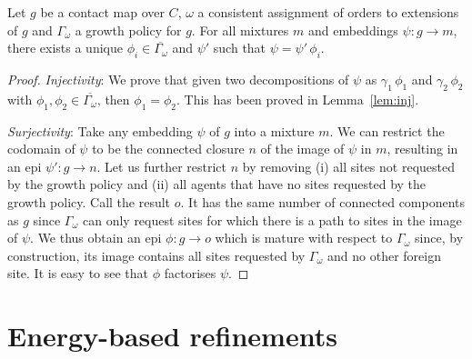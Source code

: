 \documentclass[a4paper,12pt]{article}
\newcommand{\lem}[1]{Lemma~\ref{lem:#1}}
\newcommand{\gp}{\Gamma}
\newcommand{\rfns}[1]{\overline{#1}}
\newcommand{\ord}{\omega}
\newcommand{\ogp}{\gp_\ord}
\begin{document}
\begin{theorem}
  Let $g$ be a contact map over $C$,
  $\ord$ a consistent assignment of orders to extensions of $g$
  and $\ogp$ a growth policy for $g$.
  For all mixtures $m$ and embeddings $\psi: g \to m$,
  there exists a unique $\phi_i \in \rfns{\ogp}$
  and $\psi'$ such that $\psi = \psi' \, \phi_i$.
\end{theorem}
\begin{proof}
  \emph{Injectivity}:
  We prove that given two decompositions of $\psi$
  as $\gamma_1\,\phi_1$ and $\gamma_2\,\phi_2$
  with $\phi_1,\phi_2 \in \rfns{\ogp}$,
  then $\phi_1 = \phi_2$.
  This has been proved in \lem{inj}.

  \emph{Surjectivity}:
  Take any embedding $\psi$ of $g$ into a mixture $m$.
  We can restrict the codomain of $\psi$ to be
  the connected closure $n$ of the image of $\psi$ in $m$,
  resulting in an epi $\psi': g \to n$.
  Let us further restrict $n$ by removing
  (i) all sites not requested by the growth policy and
  (ii) all agents that have no sites requested by the growth policy.
  Call the result $o$.
  It has the same number of connected components as $g$
  since $\ogp$ can only request sites
  for which there is a path to sites in the image of $\psi$.
  We thus obtain an epi $\phi: g \to o$
  which is mature with respect to $\ogp$ since,
  by construction, its image contains all sites
  requested by $\ogp$ and no other foreign site.
  It is easy to see that $\phi$ factorises $\psi$.
\end{proof}


\section{Energy-based refinements}
\end{document}

